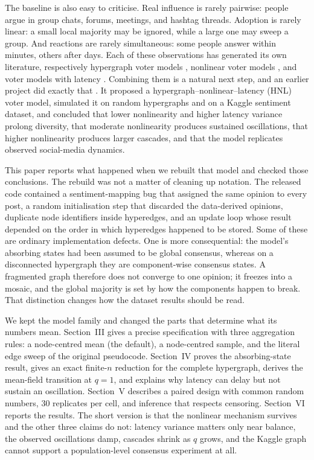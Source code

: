 \documentclass[conference]{IEEEtran}
\begin{document}
The baseline is also easy to criticise. Real influence is rarely pairwise: people argue in group chats, forums, meetings, and hashtag threads. Adoption is rarely linear: a small local majority may be ignored, while a large one may sweep a group. And reactions are rarely simultaneous: some people answer within minutes, others after days. Each of these observations has generated its own literature, respectively hypergraph voter models \cite{golovin2023}, nonlinear voter models \cite{ramirez2023}, and voter models with latency \cite{palermo2024}. Combining them is a natural next step, and an earlier project did exactly that \cite{hnl2024}. It proposed a hypergraph--nonlinear--latency (HNL) voter model, simulated it on random hypergraphs and on a Kaggle sentiment dataset, and concluded that lower nonlinearity and higher latency variance prolong diversity, that moderate nonlinearity produces sustained oscillations, that higher nonlinearity produces larger cascades, and that the model replicates observed social-media dynamics.

This paper reports what happened when we rebuilt that model and checked those conclusions. The rebuild was not a matter of cleaning up notation. The released code contained a sentiment-mapping bug that assigned the same opinion to every post, a random initialisation step that discarded the data-derived opinions, duplicate node identifiers inside hyperedges, and an update loop whose result depended on the order in which hyperedges happened to be stored. Some of these are ordinary implementation defects. One is more consequential: the model's absorbing states had been assumed to be global consensus, whereas on a disconnected hypergraph they are component-wise consensus states. A fragmented graph therefore does not converge to one opinion; it freezes into a mosaic, and the global majority is set by how the components happen to break. That distinction changes how the dataset results should be read.

We kept the model family and changed the parts that determine what its numbers mean. Section~III gives a precise specification with three aggregation rules: a node-centred mean (the default), a node-centred sample, and the literal edge sweep of the original pseudocode. Section~IV proves the absorbing-state result, gives an exact finite-$n$ reduction for the complete hypergraph, derives the mean-field transition at $q=1$, and explains why latency can delay but not sustain an oscillation. Section~V describes a paired design with common random numbers, 30 replicates per cell, and inference that respects censoring. Section~VI reports the results. The short version is that the nonlinear mechanism survives and the other three claims do not: latency variance matters only near balance, the observed oscillations damp, cascades shrink as $q$ grows, and the Kaggle graph cannot support a population-level consensus experiment at all.
\end{document}
